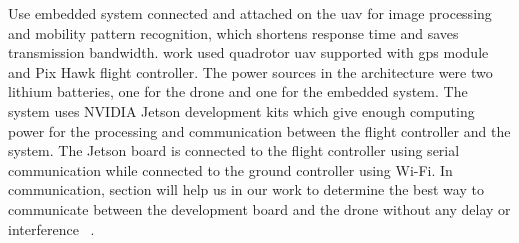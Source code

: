 \documentclass[../main.tex]{subfiles}
\begin{document}
Use embedded system connected and attached on the \gls{uav} for image processing and mobility pattern recognition, which shortens response time and saves transmission bandwidth. 
\citeauthor{Zhao18} work used quadrotor \gls{uav} supported with \gls{gps} module and Pix Hawk flight controller. The power sources in the architecture were two lithium batteries, one for the drone and one for the embedded system. The system uses	NVIDIA Jetson development kits which give enough computing power for the processing and communication between the flight controller and the system. The Jetson board is connected to the flight controller using serial communication while connected to the ground controller using Wi-Fi. In communication, section will help us in our work to determine the best way to communicate between the development board and the drone without any delay or interference ~\cite{Zhao18}. 



\end{document}
